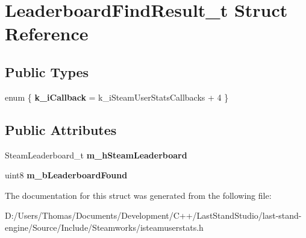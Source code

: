 \hypertarget{structLeaderboardFindResult__t}{}\section{Leaderboard\+Find\+Result\+\_\+t Struct Reference}
\label{structLeaderboardFindResult__t}
\subsection*{Public Types}
\begin{DoxyCompactItemize}
\item 
\hypertarget{structLeaderboardFindResult__t_aa2bfc3d239a232ed6c6e1a1361fd44ce}{}enum \{ {\bfseries k\+\_\+i\+Callback} = k\+\_\+i\+Steam\+User\+Stats\+Callbacks + 4
 \}\label{structLeaderboardFindResult__t_aa2bfc3d239a232ed6c6e1a1361fd44ce}

\end{DoxyCompactItemize}
\subsection*{Public Attributes}
\begin{DoxyCompactItemize}
\item 
\hypertarget{structLeaderboardFindResult__t_a358994c15b5c5a7d6c4a9875d34e1500}{}Steam\+Leaderboard\+\_\+t {\bfseries m\+\_\+h\+Steam\+Leaderboard}\label{structLeaderboardFindResult__t_a358994c15b5c5a7d6c4a9875d34e1500}

\item 
\hypertarget{structLeaderboardFindResult__t_aaca86faa1ccbceff400f6800b42a19d2}{}uint8 {\bfseries m\+\_\+b\+Leaderboard\+Found}\label{structLeaderboardFindResult__t_aaca86faa1ccbceff400f6800b42a19d2}

\end{DoxyCompactItemize}


The documentation for this struct was generated from the following file\+:\begin{DoxyCompactItemize}
\item 
D\+:/\+Users/\+Thomas/\+Documents/\+Development/\+C++/\+Last\+Stand\+Studio/last-\/stand-\/engine/\+Source/\+Include/\+Steamworks/isteamuserstats.\+h\end{DoxyCompactItemize}

